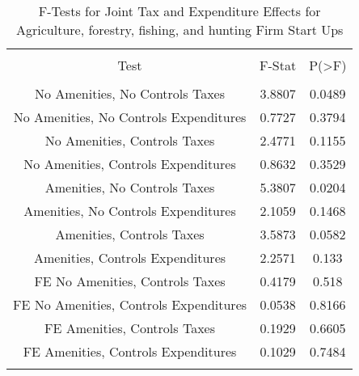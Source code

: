 
\begin{table}[!htbp] \centering 
  \caption{F-Tests for Joint Tax and Expenditure Effects for Agriculture, forestry, fishing, and hunting Firm Start Ups} 
  \label{11Ftests} 
\begin{tabular}{@{\extracolsep{5pt}} ccc} 
\\[-1.8ex]\hline 
\hline \\[-1.8ex] 
Test & F-Stat & P(\textgreater F) \\ 
\hline \\[-1.8ex] 
No Amenities, No Controls Taxes & 3.8807 & 0.0489 \\ 
No Amenities, No Controls Expenditures & 0.7727 & 0.3794 \\ 
No Amenities, Controls Taxes & 2.4771 & 0.1155 \\ 
No Amenities, Controls Expenditures & 0.8632 & 0.3529 \\ 
Amenities, No Controls Taxes & 5.3807 & 0.0204 \\ 
Amenities, No Controls Expenditures & 2.1059 & 0.1468 \\ 
Amenities, Controls Taxes & 3.5873 & 0.0582 \\ 
Amenities, Controls Expenditures & 2.2571 & 0.133 \\ 
FE No Amenities, Controls Taxes & 0.4179 & 0.518 \\ 
FE No Amenities, Controls Expenditures & 0.0538 & 0.8166 \\ 
FE Amenities, Controls Taxes & 0.1929 & 0.6605 \\ 
FE Amenities, Controls Expenditures & 0.1029 & 0.7484 \\ 
\hline \\[-1.8ex] 
\end{tabular} 
\end{table} 
